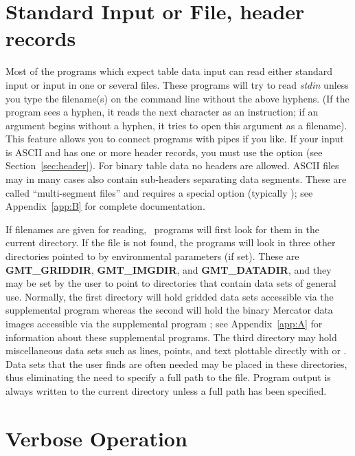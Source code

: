 \section{Standard Input or File, header records}

Most of the programs which expect table data input can read
either standard input or input in one or several files.
These programs will try to read \emph{stdin} unless you type
the filename(s) on the command line without the above hyphens.
(If the program sees a hyphen, it reads the next character
as an instruction; if an argument begins without a hyphen,
it tries to open this argument as a filename).
This feature allows you to connect programs with pipes if
you like.  If your input is ASCII and has one or more header
records, you must use the  option (see Section~\ref{sec:header}).
For binary table data no headers are allowed.
ASCII files may in many cases also contain sub-headers
separating data segments.  These are called ``multi-segment files''
and requires a special option (typically ); see Appendix~\ref{app:B} for complete
documentation. 

If filenames are given for reading, \GMT\ programs will first look for them in the
current directory.  If the file is not found, the programs
will look in three other directories pointed to by environmental
parameters (if set).  These are \textbf{GMT\_GRIDDIR}, \textbf{GMT\_IMGDIR}, and
\textbf{GMT\_DATADIR}, and they may be set by the user to point to directories
that contain data sets of general use.  Normally, the first directory will
hold gridded data sets accessible via the supplemental program 
whereas the second will hold the binary Mercator data images accessible via
the supplemental program ; see Appendix~\ref{app:A} for information
about these supplemental programs.  The third directory may hold miscellaneous
data sets such as lines, points, and text plottable directly with 
or .  Data sets that the user finds are often needed
may be placed in these directories, thus eliminating the need to specify
a full path to the file.  Program output is always written to the
current directory unless a full path has been specified.

\section{Verbose Operation}

